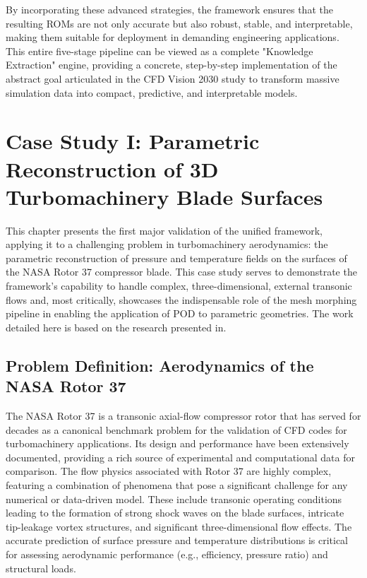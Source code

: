 \documentclass[dsc, EN]{ufabcFHZh}
\begin{document}
{By incorporating these advanced strategies, the framework ensures that the resulting ROMs are not only accurate but also robust, stable, and interpretable, making them suitable for deployment in demanding engineering applications. This entire five-stage pipeline can be viewed as a complete "Knowledge Extraction" engine, providing a concrete, step-by-step implementation of the abstract goal articulated in the CFD Vision 2030 study to transform massive simulation data into compact, predictive, and interpretable models.   


\chapter{Case Study I: Parametric Reconstruction of 3D Turbomachinery Blade Surfaces}

This chapter presents the first major validation of the unified framework, applying it to a challenging problem in turbomachinery aerodynamics: the parametric reconstruction of pressure and temperature fields on the surfaces of the NASA Rotor 37 compressor blade. This case study serves to demonstrate the framework's capability to handle complex, three-dimensional, external transonic flows and, most critically, showcases the indispensable role of the mesh morphing pipeline in enabling the application of POD to parametric geometries. The work detailed here is based on the research presented in. 

\section{Problem Definition: Aerodynamics of the NASA Rotor 37}

The NASA Rotor 37 is a transonic axial-flow compressor rotor that has served for decades as a canonical benchmark problem for the validation of CFD codes for turbomachinery applications. Its design and performance have been extensively documented, providing a rich source of experimental and computational data for comparison. The flow physics associated with Rotor 37 are highly complex, featuring a combination of phenomena that pose a significant challenge for any numerical or data-driven model. These include transonic operating conditions leading to the formation of strong shock waves on the blade surfaces, intricate tip-leakage vortex structures, and significant three-dimensional flow effects. The accurate prediction of surface pressure and temperature distributions is critical for assessing aerodynamic performance (e.g., efficiency, pressure ratio) and structural loads. 

}
\end{document}
